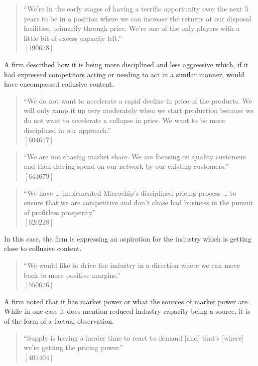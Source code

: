 \begin{quote}
``We're in the early stages of having a terrific opportunity over the next 5 years to be in a position where we can increase the returns at our disposal facilities, primarily through price. We’re one of the only players with a little bit of excess capacity left.'' \\
$[190678]$
\end{quote}

A firm described how it is being more disciplined and less aggressive which, if it had expressed competitors acting or needing to act in a similar manner, would have encompassed collusive content.

\begin{quote}
``We do not want to accelerate a rapid decline in price of the products. We will only ramp it up very moderately when we start production because we do not want to accelerate a collapse in price. We want to be more disciplined in our approach.'' \\
$[604617]$
\end{quote}

\begin{quote}
``We are not chasing market share. We are focusing on quality customers and then driving spend on our network by our existing customers.'' \\
$[643679]$
\end{quote}

\begin{quote}
``We have … implemented Microchip's disciplined pricing process … to ensure that we are competitive and don't chase bad business in the pursuit of profitless prosperity.'' \\
$[620228]$
\end{quote}

In this case, the firm is expressing an aspiration for the industry which is getting close to collusive content.

\begin{quote}
``We would like to drive the industry in a direction where we can move back to more positive margins.'' \\
$[550676]$
\end{quote}

A firm noted that it has market power or what the sources of market power are. While in one case it does mention reduced industry capacity being a source, it is of the form of a factual observation.

\begin{quote}
``Supply is having a harder time to react to demand [and] that's [where] we're getting the pricing power.'' \\
$[401404]$
\end{quote}

